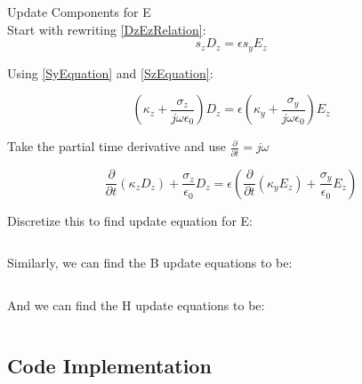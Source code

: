 \documentclass{article}
\begin{document}
 
 Update Components for E\\

 Start with rewriting \ref{DzEzRelation}:
 \begin{equation}s_{z}D_{z}=\epsilon s_{y}E_{z}\end{equation}

 Using \ref{SyEquation} and \ref{SzEquation}:

 \begin{equation}(\kappa_{z}+\frac{\sigma_{z}}{j\omega\epsilon_{0}})D_{z}=\epsilon
   (\kappa_{y}+\frac{\sigma_{y}}{j\omega\epsilon_{0}})E_{z}\end{equation}

 Take the partial time derivative and use $\frac{\partial}{\partial t}= j \omega$
 
 \begin{equation}
   \frac{\partial}{\partial t}(\kappa_{z}D_{z})+\frac{\sigma_{z}}{\epsilon_{0}}D_{z}=
   \epsilon(\frac{\partial}{\partial t}(\kappa_{y}E_{z})+\frac{\sigma_{y}}{\epsilon_{0}}E_{z})
 \end{equation}

 Discretize this to find update equation for E:

 \begin{equation}

 \end{equation}
 
 Similarly, we can find the B update equations to be:

 \begin{equation}

 \end{equation}
 \begin{equation}

 \end{equation}

 And we can find the H update equations to be:

 \begin{equation}

 \end{equation}
 \begin{equation}

 \end{equation} 

\subsection{Code Implementation}
\end{document}
